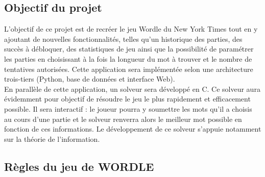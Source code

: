 \subsection{Objectif du projet}

\tabto{1cm}L'objectif de ce projet est de recréer le jeu Wordle du New York Times tout en y ajoutant de nouvelles fonctionnalités, telles qu'un historique des parties, des succès à débloquer, des statistiques de jeu ainsi que la possibilité de paramétrer les parties en choisissant à la fois la longueur du mot à trouver et le nombre de tentatives autorisées. Cette application sera implémentée selon une architecture trois-tiers (Python, base de données et interface Web).\\

\tabto{1cm}En parallèle de cette application, un solveur sera développé en C. Ce solveur aura évidemment pour objectif de résoudre le jeu le plus rapidement et efficacement possible. Il sera interactif : le joueur pourra y soumettre les mots qu'il a choisis au cours d'une partie et le solveur renverra alors le meilleur mot possible en fonction de ces informations. Le développement de ce solveur s'appuie notamment sur la théorie de l'information. 


\subsection{Règles du jeu de WORDLE}

